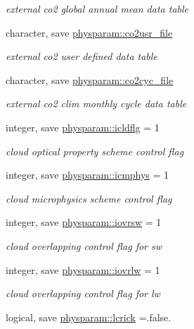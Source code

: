 \begin{DoxyCompactItemize}
\begin{DoxyCompactList}\small\item\em external co2 global annual mean data table \end{DoxyCompactList}\item 
character, save \hyperlink{namespacephysparam_a2af9769060fccf9c42e14a30cf21c0aa}{physparam\+::co2usr\+\_\+file}
\begin{DoxyCompactList}\small\item\em external co2 user defined data table \end{DoxyCompactList}\item 
character, save \hyperlink{namespacephysparam_afe0dc3a936d79b4d7dd58fe29376cb1a}{physparam\+::co2cyc\+\_\+file}
\begin{DoxyCompactList}\small\item\em external co2 clim monthly cycle data table \end{DoxyCompactList}\item 
integer, save \hyperlink{namespacephysparam_aaba5cffa32ce34374f15cb09e21ab973}{physparam\+::icldflg} = 1
\begin{DoxyCompactList}\small\item\em cloud optical property scheme control flag \end{DoxyCompactList}\item 
integer, save \hyperlink{namespacephysparam_af259ebea0c378b3b07343141977db03e}{physparam\+::icmphys} = 1
\begin{DoxyCompactList}\small\item\em cloud microphysics scheme control flag \end{DoxyCompactList}\item 
integer, save \hyperlink{namespacephysparam_a2f0c4c2c8f4a93048ab2b84826498007}{physparam\+::iovrsw} = 1
\begin{DoxyCompactList}\small\item\em cloud overlapping control flag for sw \end{DoxyCompactList}\item 
integer, save \hyperlink{namespacephysparam_a644d850cdfb6dd159e51223f715683f6}{physparam\+::iovrlw} = 1
\begin{DoxyCompactList}\small\item\em cloud overlapping control flag for lw \end{DoxyCompactList}\item 
logical, save \hyperlink{namespacephysparam_a3506e1f83500ea78568ab697f55cadb4}{physparam\+::lcrick} =.false.

\end{DoxyCompactItemize}
